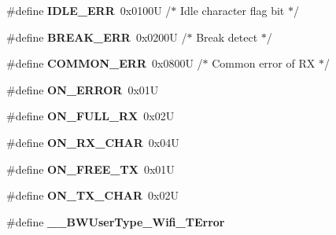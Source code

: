 \begin{DoxyCompactItemize}
\item 
\hypertarget{group___wifi__module_ga4584e89e739c19496724ba117e62aed9}{\#define {\bfseries I\-D\-L\-E\-\_\-\-E\-R\-R}~0x0100\-U       /$\ast$ Idle character flag bit   $\ast$/}\label{group___wifi__module_ga4584e89e739c19496724ba117e62aed9}

\item 
\hypertarget{group___wifi__module_ga0cb4d61ee3347eb62142ca0eb1d02a53}{\#define {\bfseries B\-R\-E\-A\-K\-\_\-\-E\-R\-R}~0x0200\-U       /$\ast$ Break detect              $\ast$/}\label{group___wifi__module_ga0cb4d61ee3347eb62142ca0eb1d02a53}

\item 
\hypertarget{group___wifi__module_ga86e7d2a6a6227d9fbb84d459454c2359}{\#define {\bfseries C\-O\-M\-M\-O\-N\-\_\-\-E\-R\-R}~0x0800\-U       /$\ast$ Common error of R\-X       $\ast$/}\label{group___wifi__module_ga86e7d2a6a6227d9fbb84d459454c2359}

\item 
\hypertarget{group___wifi__module_gab5034f048fef6a41e7901a4e34368f3d}{\#define {\bfseries O\-N\-\_\-\-E\-R\-R\-O\-R}~0x01\-U}\label{group___wifi__module_gab5034f048fef6a41e7901a4e34368f3d}

\item 
\hypertarget{group___wifi__module_ga2cf6b6a2b8c83f7d1d7e6134c6bd9a4a}{\#define {\bfseries O\-N\-\_\-\-F\-U\-L\-L\-\_\-\-R\-X}~0x02\-U}\label{group___wifi__module_ga2cf6b6a2b8c83f7d1d7e6134c6bd9a4a}

\item 
\hypertarget{group___wifi__module_gad07f43952e300ba1e45521ce777c09d4}{\#define {\bfseries O\-N\-\_\-\-R\-X\-\_\-\-C\-H\-A\-R}~0x04\-U}\label{group___wifi__module_gad07f43952e300ba1e45521ce777c09d4}

\item 
\hypertarget{group___wifi__module_ga71d35387335972e4f6ae07ecccf27724}{\#define {\bfseries O\-N\-\_\-\-F\-R\-E\-E\-\_\-\-T\-X}~0x01\-U}\label{group___wifi__module_ga71d35387335972e4f6ae07ecccf27724}

\item 
\hypertarget{group___wifi__module_gaf02aa8bfc7e9b5338168db9ff9077c0d}{\#define {\bfseries O\-N\-\_\-\-T\-X\-\_\-\-C\-H\-A\-R}~0x02\-U}\label{group___wifi__module_gaf02aa8bfc7e9b5338168db9ff9077c0d}

\item 
\hypertarget{group___wifi__module_gaa93b0565928a3b2796b75bee689a96d1}{\#define {\bfseries \-\_\-\-\_\-\-B\-W\-User\-Type\-\_\-\-Wifi\-\_\-\-T\-Error}}\label{group___wifi__module_gaa93b0565928a3b2796b75bee689a96d1}


\end{DoxyCompactItemize}
